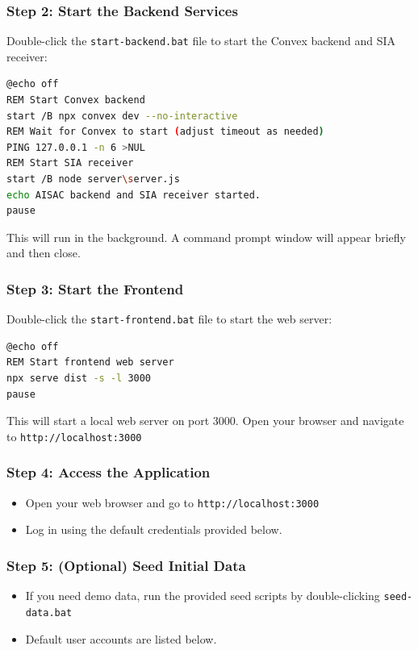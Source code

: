 \documentclass[12pt,a4paper]{article}
\begin{document}
\subsubsection{Step 2: Start the Backend Services}
Double-click the \texttt{start-backend.bat} file to start the Convex backend and SIA receiver:

\begin{lstlisting}[language=bash]
@echo off
REM Start Convex backend
start /B npx convex dev --no-interactive
REM Wait for Convex to start (adjust timeout as needed)
PING 127.0.0.1 -n 6 >NUL
REM Start SIA receiver
start /B node server\server.js
echo AISAC backend and SIA receiver started.
pause
\end{lstlisting}

This will run in the background. A command prompt window will appear briefly and then close.

\subsubsection{Step 3: Start the Frontend}
Double-click the \texttt{start-frontend.bat} file to start the web server:

\begin{lstlisting}[language=bash]
@echo off
REM Start frontend web server
npx serve dist -s -l 3000
pause
\end{lstlisting}

This will start a local web server on port 3000. Open your browser and navigate to \texttt{http://localhost:3000}

\subsubsection{Step 4: Access the Application}
\begin{itemize}
\item Open your web browser and go to \texttt{http://localhost:3000}
\item Log in using the default credentials provided below.
\end{itemize}

\subsubsection{Step 5: (Optional) Seed Initial Data}
\begin{itemize}
\item If you need demo data, run the provided seed scripts by double-clicking \texttt{seed-data.bat}
\item Default user accounts are listed below.
\end{itemize}
\end{document}
